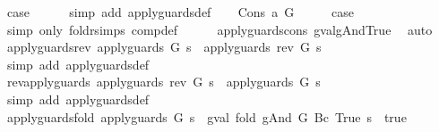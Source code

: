 \begin{isabellebody}
\ {\isacharquery}case\isanewline
\ \ \ \ \isamarkupfalse%
\ {\isacharparenleft}simp\ add{\isacharcolon}\ apply{\isacharunderscore}guards{\isacharunderscore}def{\isacharparenright}\isanewline
{}\isamarkupfalse%
\isanewline
\ \ \isamarkupfalse%
\ {\isacharparenleft}Cons\ a\ G{\isacharparenright}\isanewline
\ \ \isamarkupfalse%
\ \isamarkupfalse%
\ {\isacharquery}case\isanewline
\ \ \ \ \isamarkupfalse%
\ {\isacharparenleft}simp\ only{\isacharcolon}\ foldr{\isachardot}simps\ comp{\isacharunderscore}def{\isacharparenright}\isanewline
\ \ \ \ \isamarkupfalse%
\ apply{\isacharunderscore}guards{\isacharunderscore}cons\ gval{\isacharunderscore}gAnd{\isacharunderscore}True\ \isamarkupfalse%
\ auto\isanewline
{}\isamarkupfalse%
%
\endisatagproof
{\isafoldproof}%
%
\isadelimproof
\isanewline
%
\endisadelimproof
\isanewline
{}\isamarkupfalse%
\ apply{\isacharunderscore}guards{\isacharunderscore}rev{\isacharcolon}\ {\isachardoublequoteopen}apply{\isacharunderscore}guards\ G\ s\ {\isacharequal}\ apply{\isacharunderscore}guards\ {\isacharparenleft}rev\ G{\isacharparenright}\ s{\isachardoublequoteclose}\isanewline
%
\isadelimproof
\ \ %
\endisadelimproof
%
\isatagproof
{}\isamarkupfalse%
\ {\isacharparenleft}simp\ add{\isacharcolon}\ apply{\isacharunderscore}guards{\isacharunderscore}def{\isacharparenright}%
\endisatagproof
{\isafoldproof}%
%
\isadelimproof
\isanewline
%
\endisadelimproof
\isanewline
{}\isamarkupfalse%
\ rev{\isacharunderscore}apply{\isacharunderscore}guards{\isacharcolon}\ {\isachardoublequoteopen}apply{\isacharunderscore}guards\ {\isacharparenleft}rev\ G{\isacharparenright}\ s\ {\isacharequal}\ apply{\isacharunderscore}guards\ G\ s{\isachardoublequoteclose}\isanewline
%
\isadelimproof
\ \ %
\endisadelimproof
%
\isatagproof
{}\isamarkupfalse%
\ {\isacharparenleft}simp\ add{\isacharcolon}\ apply{\isacharunderscore}guards{\isacharunderscore}def{\isacharparenright}%
\endisatagproof
{\isafoldproof}%
%
\isadelimproof
\isanewline
%
\endisadelimproof
\isanewline
{}\isamarkupfalse%
\ apply{\isacharunderscore}guards{\isacharunderscore}fold{\isacharcolon}\ {\isachardoublequoteopen}apply{\isacharunderscore}guards\ G\ s\ {\isacharequal}\ {\isacharparenleft}gval\ {\isacharparenleft}fold\ gAnd\ G\ {\isacharparenleft}Bc\ True{\isacharparenright}{\isacharparenright}\ s\ {\isacharequal}\ true{\isacharparenright}{\isachardoublequoteclose}\isanewline
%
\isadelimproof

\end{isabellebody}
